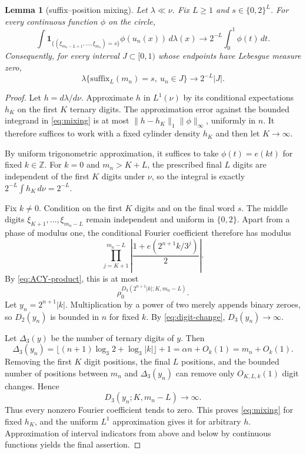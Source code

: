 \documentclass[11pt]{article}
\newtheorem{lemma}[theorem]{Lemma}
\theoremstyle{remark}
\newcommand{\one}{\mathbf 1}
\begin{document}
\begin{lemma}[suffix--position mixing]\label{lem:mixing}
Let $\lambda\ll\nu$.  Fix $L\ge1$ and $s\in\{0,2\}^L$.  For every continuous function $\phi$ on the circle,
\begin{equation}\label{eq:mixing}
 \int \one_{\{(\xi_{m_n-L+1},\ldots,\xi_{m_n})=s\}}
       \phi(u_n(x))\,d\lambda(x)
 \longrightarrow 2^{-L}\int_0^1\phi(t)\,dt.
\end{equation}
Consequently, for every interval $J\subset[0,1)$ whose endpoints have Lebesgue measure zero,
\[
 \lambda\{\text{suffix}_L(m_n)=s,\ u_n\in J\}
 \longrightarrow 2^{-L}|J|.
\]
\end{lemma}

\begin{proof}
Let $h=d\lambda/d\nu$.  Approximate $h$ in $L^1(\nu)$ by its conditional expectations $h_K$ on the first $K$ ternary digits.  The approximation error against the bounded integrand in \eqref{eq:mixing} is at most $\|h-h_K\|_1\|\phi\|_\infty$, uniformly in $n$.  It therefore suffices to work with a fixed cylinder density $h_K$ and then let $K\to\infty$.

By uniform trigonometric approximation, it suffices to take $\phi(t)=e(kt)$ for fixed $k\in\mathbb Z$.  For $k=0$ and $m_n>K+L$, the prescribed final $L$ digits are independent of the first $K$ digits under $\nu$, so the integral is exactly $2^{-L}\int h_K\,d\nu=2^{-L}$.

Fix $k\ne0$.  Condition on the first $K$ digits and on the final word $s$.  The middle digits $\xi_{K+1},\ldots,\xi_{m_n-L}$ remain independent and uniform in $\{0,2\}$.  Apart from a phase of modulus one, the conditional Fourier coefficient therefore has modulus
\begin{equation}\label{eq:fourier-product}
 \prod_{j=K+1}^{m_n-L}
 \left|\frac{1+e(2^{n+1}k/3^j)}2\right|.
\end{equation}
By \eqref{eq:ACY-product}, this is at most
\[
 \rho_0^{D_3(2^{n+1}|k|;K,m_n-L)}.
\]
Let $y_n=2^{n+1}|k|$.  Multiplication by a power of two merely appends binary zeroes, so $D_2(y_n)$ is bounded in $n$ for fixed $k$.  By \eqref{eq:digit-change}, $D_3(y_n)\to\infty$.

Let $\Delta_3(y)$ be the number of ternary digits of $y$.  Then
\[
 \Delta_3(y_n)=\lfloor(n+1)\log_3 2+\log_3|k|\rfloor+1
 =\alpha n+O_k(1)=m_n+O_k(1).
\]
Removing the first $K$ digit positions, the final $L$ positions, and the bounded number of positions between $m_n$ and $\Delta_3(y_n)$ can remove only $O_{K,L,k}(1)$ digit changes.  Hence
\[
 D_3(y_n;K,m_n-L)\longrightarrow\infty.
\]
Thus every nonzero Fourier coefficient tends to zero.  This proves \eqref{eq:mixing} for fixed $h_K$, and the uniform $L^1$ approximation gives it for arbitrary $h$.  Approximation of interval indicators from above and below by continuous functions yields the final assertion.
\end{proof}
\end{document}
